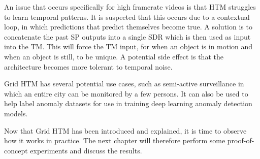 An issue that occurs specifically for high framerate videos is that HTM struggles to learn temporal patterns. It is suspected that this occurs due to a contextual loop, in which predictions that predict themselves become true. A solution is to concatenate the past SP outputs into a single SDR which is then used as input into the TM. This will force the TM input, for when an object is in motion and when an object is still, to be unique. A potential side effect is that the architecture becomes more tolerant to temporal noise.
\par
Grid HTM has several potential use cases, such as semi-active surveillance in which an entire city can be monitored by a few persons. It can also be used to help label anomaly datasets for use in training deep learning anomaly detection models.
\par
Now that Grid HTM has been introduced and explained, it is time to observe how it works in practice. The next chapter will therefore perform some proof-of-concept experiments and discuss the results.